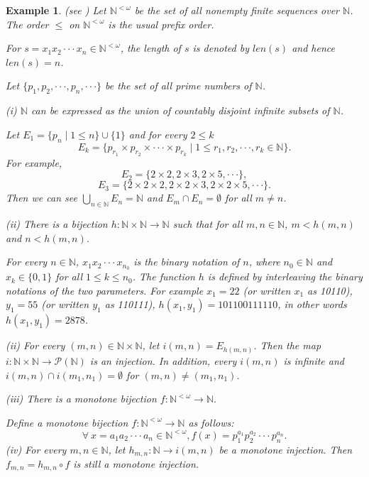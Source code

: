 \documentclass[preprint,12pt]{elsarticle}
\numberwithin{equation}{section}
\newtheorem{example}[theorem]{Example}
\begin{document}
\begin{example}{\rm (see \cite{AB75})\setlength{\baselineskip}{1.3\baselineskip}
 Let $\mathbb{N}^{<\omega}$ be the set of all nonempty finite sequences over $\mathbb{N}$. The
order $\leq $ on $\mathbb{N}^{<\omega}$ is the usual prefix order.

For $s=x_{1}x_{2}\cdot\cdot\cdot x_{n}\in\mathbb{N}^{<\omega}$, the length of $s$ is denoted by $len(s)$ and hence $len(s)=n$.


Let $\{p_{1},p_{2},\cdot\cdot\cdot,p_{n},\cdot\cdot\cdot\}$ be the set of all prime numbers of $\mathbb{N}$.


(i) $\mathbb{N}$ can be expressed as the union of countably disjoint infinite subsets of $\mathbb{N}$.

Let $E_{1}=\{p_{n}\mid 1\leq n\}\cup\{1\}$ and for every $2\leq k$
$$E_{k}=\{p_{r_{1}}\times p_{r_{2}}\times\cdot\cdot\cdot\times p_{r_{k}}\mid 1\leq r_{1},r_{2},\cdot\cdot\cdot, r_{k}\in\mathbb{N}\}.$$
For example, $$E_{2}=\{2\times2,2\times3,2\times5,\cdot\cdot\cdot\},$$ $$E_{3}=\{2\times2\times2,2\times2\times3,2\times2\times5,\cdot\cdot\cdot\}.$$ Then we can see $\bigcup\limits_{n\in\mathbb{N}} E_{n}=\mathbb{N}$ and $E_{m}\cap E_{n}=\emptyset$ for all $m\neq n$.

(ii) There is a bijection $h:\mathbb{N}\times \mathbb{N}\longrightarrow\mathbb{N}$ such that for all $m,n\in\mathbb{N}$, $m<h(m,n)$ and $n<h(m,n)$.

For every $n\in\mathbb{N}$, $x_{1}x_{2}\cdot\cdot\cdot x_{n_{0}}$ is the binary notation of $n$, where $n_{0}\in\mathbb{N}$ and $x_{k}\in\{0,1\}$ for all $1\leq k\leq n_{0}$. The function $h$ is defined by interleaving the binary notations of the two parameters. For example $x_{1}=22$ (or written $x_{1}$ as 10110), $y_{1}=55$ (or written $y_{1}$ as 110111), $h(x_{1},y_{1})=101100111110$, in other words $h(x_{1},y_{1})=2878$.

(ii) For every $(m,n)\in\mathbb{N}\times \mathbb{N}$, let $i(m,n)=E_{h(m,n)}$. Then the map $i:\mathbb{N}\times\mathbb{N}\longrightarrow\mathcal{P}(\mathbb{N})$ is an injection. In addition, every $i(m,n)$ is infinite and $i(m,n)\cap i(m_{1},n_{1})=\emptyset$ for $(m,n)\neq(m_{1},n_{1})$.

(iii) There is a  monotone bijection $f:\mathbb{N}^{<\omega}\longrightarrow \mathbb{N}$.

Define a monotone bijection $f:\mathbb{N}^{<\omega}\longrightarrow \mathbb{N}$ as follows:
$$\forall\ x=a_{1}a_{2}\cdot\cdot\cdot a_{n}\in\mathbb{N}^{<\omega}, f(x)=p_{1}^{a_{1}}p_{2}^{a_{2}}\cdot\cdot\cdot p_{n}^{a_{n}}.$$
(iv) For every $m,n\in\mathbb{N}$, let $h_{m,n}:\mathbb{N}\longrightarrow i(m,n)$ be a monotone injection. Then $f_{m,n}=h_{m,n}\circ f$ is still a monotone injection.

}
\end{example}
\end{document}
